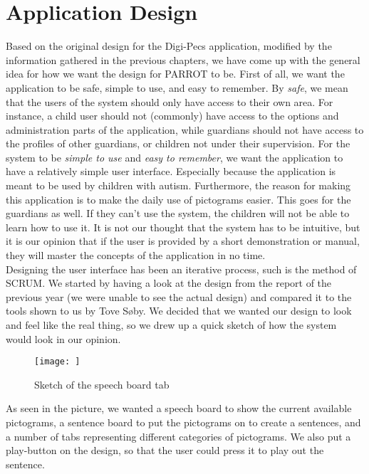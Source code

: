 \chapter{Application Design}
\label{appdes}
Based on the original design for the Digi-Pecs application, modified by the information gathered in the previous chapters, we have come up with the general idea for how we want the design for PARROT to be.\newline
First of all, we want the application to be safe, simple to use, and easy to remember.\newline
By \textit{safe}, we mean that the users of the system should only have access to their own area. For instance, a child user should not (commonly) have access to the options and administration parts of the application, while guardians should not have access to the profiles of other guardians, or children not under their supervision.\newline
For the system to be \textit{simple to use} and \textit{easy to remember}, we want the application to have a relatively simple user interface. Especially because the application is meant to be used by children with autism. Furthermore, the reason for making this application is to make the daily use of pictograms easier. This goes for the guardians as well. If they can't use the system, the children will not be able to learn how to use it.\newline
It is not our thought that the system has to be intuitive, but it is our opinion that if the user is provided by a short demonstration or manual, they will master the concepts of the application in no time.\newline
\\
Designing the user interface has been an iterative process, such is the method of SCRUM. We started by having a look at the design from the report of the previous year (we were unable to see the actual design) and compared it to the tools shown to us by Tove S\o{}by.%
We decided that we wanted our design to look and feel like the real thing, so we drew up a quick sketch of how the system would look in our opinion.\newline
\begin{figure}[htbp]
	\centering
		\texttt{[image: ]}
	\caption{Sketch of the speech board tab}
	\label{sketchspeech}
\end{figure}
As seen in the picture, we wanted a speech board to show the current available pictograms, a sentence board to put the pictograms on to create a sentences, and a number of tabs representing different categories of pictograms. We also put a play-button on the design, so that the user could press it to play out the sentence.\newline
